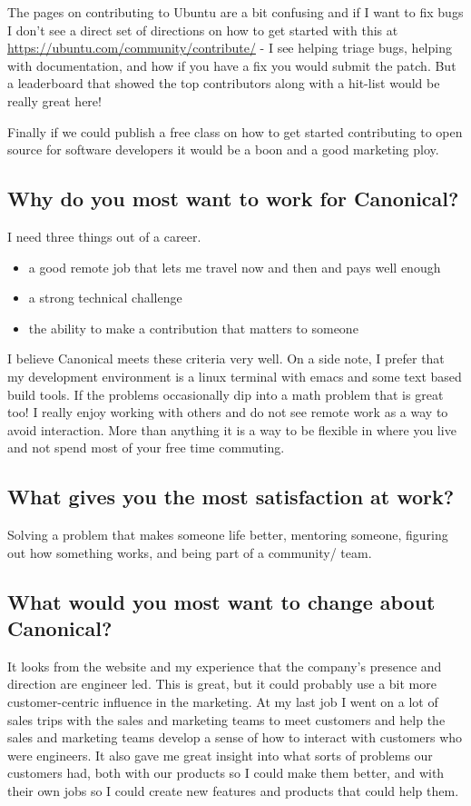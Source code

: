 \documentclass[letter,12pt]{article}
\begin{document}
The pages on contributing to Ubuntu are a bit confusing and if I want to fix bugs I don't see a direct set of directions on how to get started with this at \href{https://ubuntu.com/community/contribute/}{https://ubuntu.com/community/contribute/} - I see helping triage bugs, helping with documentation, and how if you have a fix you would submit the patch. But a leaderboard that showed the top contributors along with a hit-list would be really great here!

Finally if we could publish a free class on how to get started contributing to open source for software developers it would be a boon and a good marketing ploy.

\subsection{Why do you most want to work for Canonical?}
I need three things out of a career.
\begin{itemize}
\item a good remote job that lets me travel now and then and pays well enough
\item a strong technical challenge
\item the ability to make a contribution that matters to someone
\end{itemize}
I believe Canonical meets these criteria very well. On a side note, I prefer that my development environment is a linux terminal with emacs and some text based build tools. If the problems occasionally dip into a math problem that is great too! I really enjoy working with others and do not see remote work as a way to avoid interaction. More than anything it is a way to be flexible in where you live and not spend most of your free time commuting.

\subsection{What gives you the most satisfaction at work?}
Solving a problem that makes someone life better, mentoring someone, figuring out how something works, and being part of a community/ team.

\subsection{What would you most want to change about Canonical?}
It looks from the website and my experience that the company's presence and direction are engineer led. This is great, but it could probably use a bit more customer-centric influence in the marketing. At my last job I went on a lot of sales trips with the sales and marketing teams to meet customers and help the sales and marketing teams develop a sense of how to interact with customers who were engineers. It also gave me great insight into what sorts of problems our customers had, both with our products so I could make them better, and with their own jobs so I could create new features and products that could help them.
\end{document}
